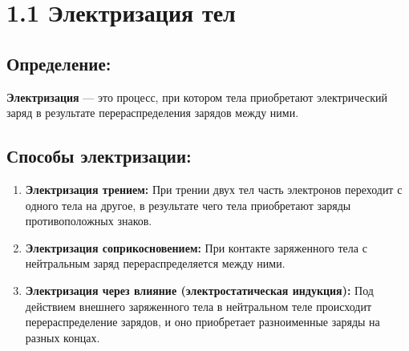 \documentclass[a4paper,12pt]{article}
\begin{document}
\begin{center}
\end{center}

\vspace{-2.5em}








\section*{1.1 Электризация тел}
\vspace{-9pt}
\subsection*{Определение:}
\vspace{-3pt}
\textbf{Электризация} — это процесс, при котором тела приобретают электрический заряд в результате перераспределения зарядов между ними.

\vspace{-9pt}
\subsection*{Способы электризации:}
\vspace{-3pt}
\begin{enumerate} [itemsep=0pt, topsep=0pt, parsep=3pt]
  \item \textbf{Электризация трением:} При трении двух тел часть электронов переходит с одного тела на другое, в результате чего тела приобретают заряды противоположных знаков.
  \item \textbf{Электризация соприкосновением:} При контакте заряженного тела с нейтральным заряд перераспределяется между ними.
  \item \textbf{Электризация через влияние (электростатическая индукция):} Под действием внешнего заряженного тела в нейтральном теле происходит перераспределение зарядов, и оно приобретает разноименные заряды на разных концах.
\end{enumerate}
\end{document}
